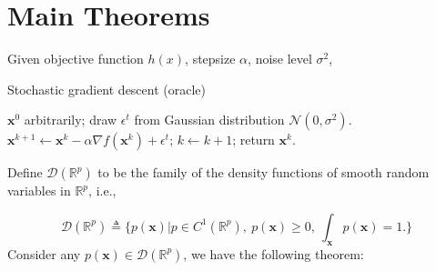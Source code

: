 \documentclass[preprint,12pt,3p]{elsarticle}
\newcommand{\bx}{\mathbf{x}}
\newcommand{\R}{\mathbb{R}}
\newcommand{\D}{\mathscr{D}}
\newcommand{\N}{\mathscr{N}}
\begin{document}
\section{Main Theorems}

\begin{algorithm}
{\small
Given objective function $h(x)$, stepsize $\alpha$, noise level $\sigma^2$,
\begin{algorithmic}\caption{Stochastic gradient descent (oracle)}\label{Alg:SGD}
 $ \bx^0$ arbitrarily;
\STATE draw $\epsilon^t$ from Gaussian distribution $\N(0, \sigma^2)$.
\STATE
$\bx^{k+1} \gets \bx^k - \alpha\nabla f(\bx^k) + \epsilon^t$;
\STATE $k\gets k+1$;
\ENDWHILE
\STATE return $\bx^k$.
\end{algorithmic}}
\end{algorithm}

Define $\D(\R^p)$ to be the family of the density functions of smooth random variables in $\R^p$, i.e.,

\begin{equation}
\D(\R^p)\triangleq \{p(\bx)\Big| p\in C^1(\R^p),~p(\bx) \geq 0,~ \int_\bx p(\bx) = 1.\}
\end{equation}
Consider any $p(\bx)\in \D(\R^p)$, we have the following theorem:
\end{document}
